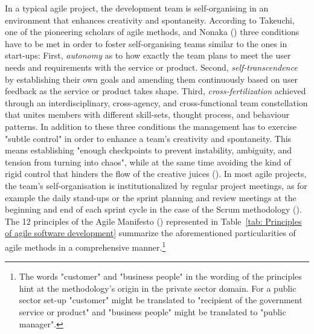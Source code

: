 In a typical agile project, the development team is self-organising in an environment that enhances creativity and spontaneity. According to Takeuchi, one of the pioneering scholars of agile methods, and Nonaka  (\cite*{TakeuchiI1986}) three conditions have to be met in order to foster self-organising teams similar to the ones in start-ups: First, \textit{autonomy} as to how exactly the team plans to meet the user needs and requirements with the service or product. Second, \textit{self-transcendence} by establishing their own goals and amending them continuously based on user feedback as the service or product takes shape. Third, \textit{cross-fertilization} achieved through an interdisciplinary, cross-agency, and cross-functional team constellation that unites members with different skill-sets, thought process, and behaviour patterns. In addition to these three conditions the management has to exercise "subtle control" in order to enhance a team's creativity and spontaneity. This means establishing "enough checkpoints to prevent instability, ambiguity, and tension from turning into chaos", while at the same time avoiding the kind of rigid control that hinders the flow of the creative juices (\cite{TakeuchiI1986}). In most agile projects, the team's self-organisation is institutionalized by regular project meetings, as for example the daily stand-ups or the sprint planning and review meetings at the beginning and end of each sprint cycle in the case of the Scrum methodology (\cite{Scrum.org2019}). The 12 principles of the Agile Manifesto (\cite*{AgileManifesto2001}) represented in Table~\ref{tab: Principles of agile software development} summarize the aforementioned particularities of agile methods in a comprehensive manner.\footnote{The words "customer" and "business people" in the wording of the principles hint at the methodology's origin in the private sector domain. For a public sector set-up "customer" might be translated to "recipient of the government service or product" and "business people" might be translated to "public manager".}
\begingroup
